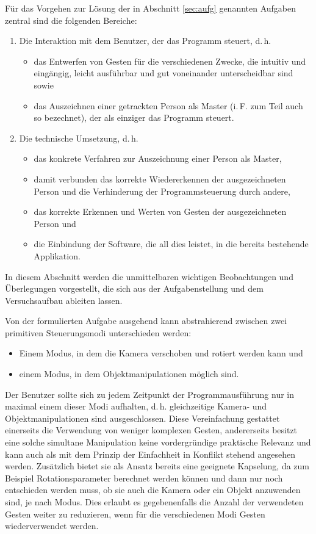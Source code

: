 \label{sec:vor}Für das Vorgehen zur Lösung der in Abschnitt \ref{sec:aufg} genannten Aufgaben zentral sind die folgenden Bereiche:
\begin{enumerate}[label=(\roman*)]
	\item Die Interaktion mit dem Benutzer, der das Programm steuert, d.\,h.
	\begin{itemize}
	\item das Entwerfen von Gesten für die verschiedenen Zwecke, die intuitiv und eingängig, leicht ausführbar und gut voneinander unterscheidbar sind sowie 
	\item das Auszeichnen einer getrackten Person als \glqq{}Master\grqq{} (i.\,F. zum Teil auch so bezechnet), der als einziger das Programm steuert.
	\end{itemize}
	\item Die technische Umsetzung, d.\,h.
	\begin{itemize}
	\item das konkrete Verfahren zur Auszeichnung einer Person als Master,
	\item damit verbunden das korrekte Wiedererkennen der ausgezeichneten Person und die Verhinderung der Programmsteuerung durch andere,
	\item das korrekte Erkennen und Werten von Gesten der ausgezeichneten Person und
	\item die Einbindung der Software, die all dies leistet, in die bereits bestehende Applikation.
	\end{itemize}
	\end{enumerate}
In diesem Abschnitt werden die unmittelbaren wichtigen Beobachtungen und Überlegungen vorgestellt, die sich aus der Aufgabenstellung und dem Versuchsaufbau ableiten lassen.\par 
Von der formulierten Aufgabe ausgehend kann abstrahierend zwischen zwei primitiven Steuerungsmodi unterschieden werden:
\begin{itemize}
	\item Einem Modus, in dem die Kamera verschoben und rotiert werden kann und 
	\item einem Modus, in dem Objektmanipulationen möglich sind.
\end{itemize} 
Der Benutzer sollte sich zu jedem Zeitpunkt der Programmausführung nur in maximal einem dieser Modi aufhalten, d.\,h. gleichzeitige Kamera- und Objektmanipulationen sind ausgeschlossen. Diese Vereinfachung gestattet einerseits die Verwendung von weniger komplexen Gesten, andererseits besitzt eine solche simultane Manipulation keine vordergründige praktische Relevanz und kann auch als mit dem Prinzip der Einfachheit in Konflikt stehend angesehen werden. Zusätzlich bietet sie als Ansatz bereits eine geeignete Kapselung, da zum Beispiel Rotationsparameter berechnet werden können und dann nur noch entschieden werden muss, ob sie auch die Kamera oder ein Objekt anzuwenden sind, je nach Modus. Dies erlaubt es gegebenenfalls die Anzahl der verwendeten Gesten weiter zu reduzieren, wenn für die verschiedenen Modi Gesten wiederverwendet werden.\par
